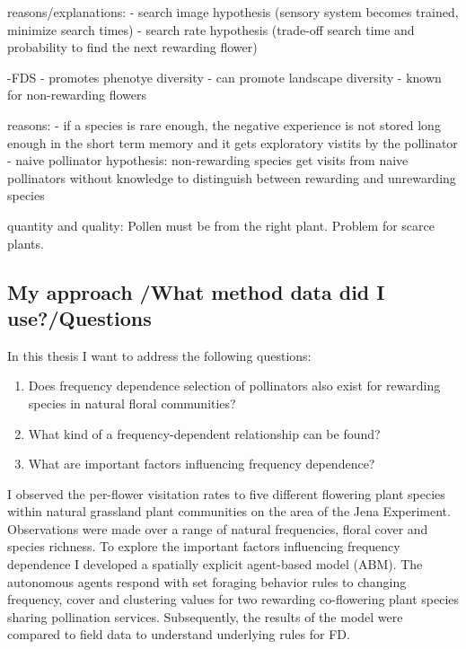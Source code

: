 reasons/explanations:
- search image hypothesis (sensory system becomes trained, minimize search times)
- search rate hypothesis (trade-off search time and probability to find the next rewarding flower)

-FDS
- promotes phenotye diversity
- can promote landscape diversity
- known for non-rewarding flowers

reasons:
- if a species is rare enough, the negative experience is not stored long enough in the short term memory and it gets exploratory vistits by the pollinator
- naive pollinator hypothesis: non-rewarding species get visits from naive pollinators without knowledge to distinguish between rewarding and unrewarding species



quantity and quality: Pollen must be from the right plant. Problem for scarce plants. 



\subsection*{My approach /What method data did I use?/Questions}
In this thesis I want to address the following questions: 

\begin{enumerate}
	\item Does frequency dependence selection of pollinators also exist for rewarding species in natural floral communities? \\
	\item	What kind of a frequency-dependent relationship can be found?\\
	\item	What are important factors influencing frequency dependence?\\
\end{enumerate}

I observed the per-flower visitation rates to five different flowering plant species within natural grassland plant communities on the area of the Jena Experiment. Observations were made over a range of natural frequencies, floral cover and species richness. To explore the important factors influencing frequency dependence I developed a spatially explicit agent-based model (ABM). The autonomous agents respond with set foraging behavior rules to changing frequency, cover and clustering values for two rewarding co-flowering plant species sharing pollination services. 
Subsequently, the results of the model were compared to field data to understand underlying rules for FD. 


